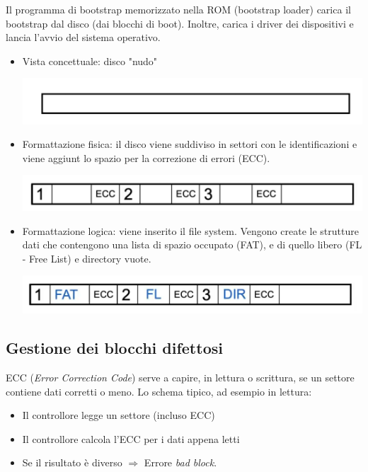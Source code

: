 \documentclass[a4paper,12pt, twoside]{report}
\begin{document}
Il programma di bootstrap memorizzato nella ROM (bootstrap loader) carica il bootstrap dal disco (dai blocchi
di boot). Inoltre, carica i driver dei dispositivi e lancia l'avvio del sistema operativo. 

\begin{itemize}
    \item Vista concettuale: disco "nudo" 
    \begin{center}
        \includegraphics[scale=0.12]{naked_disk}
    \end{center}
    \item Formattazione fisica: il disco viene suddiviso in settori con le identificazioni e viene aggiunt
    lo spazio per la correzione di errori (ECC). 
    \begin{center} 
        \includegraphics[scale=0.12]{format_physical_disk}
    \end{center}
    \item Formattazione logica: viene inserito il file system. Vengono create le strutture dati che 
    contengono una lista di spazio occupato (FAT), e di quello libero (FL - Free List) e directory vuote.
    \begin{center}
        \includegraphics[scale=0.12]{format_logical_disk}
    \end{center}
\end{itemize}

\subsection{Gestione dei blocchi difettosi}

ECC (\emph{Error Correction Code}) serve a capire, in lettura o scrittura, se un settore contiene dati 
corretti o meno. Lo schema tipico, ad esempio in lettura:
\begin{itemize}
    \item Il controllore legge un settore (incluso ECC)
    \item Il controllore calcola l'ECC per i dati appena letti
    \item Se il risultato \`e diverso $\Rightarrow$ Errore \emph{bad block}.
\end{itemize}
\end{document}
